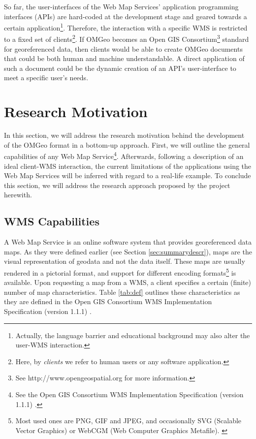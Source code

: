 \documentclass[a4paper,11pt,openany,notitlepage]{article}
\begin{document}
So far, the user-interfaces of the Web Map Services' application programming interfaces (APIs) are hard-coded at the development stage and geared towards a certain application\footnote{Actually, the language barrier and educational background may also alter the user-WMS interaction.}. Therefore, the interaction with a specific WMS is restricted to a fixed set of clients\footnote{Here, by \textit{clients} we refer to human users or any software application.}. If OMGeo becomes an Open GIS Consortium\footnote{See http://www.opengeospatial.org for more information.} standard for georeferenced data, then clients would be able to create OMGeo documents that could be both human and machine understandable. A direct application of such a document could be the dynamic creation of an API's user-interface to meet a specific user's needs.

%
\section{Research Motivation} \label{sec:motivation}
\indent

In this section, we will address the research motivation behind the development of the OMGeo format in a bottom-up approach. First, we will outline the general capabilities of any Web Map Service\footnote{See the Open GIS Consortium WMS Implementation Specification (version 1.1.1) \cite{ogc}.}. Afterwards, following a description of an ideal client-WMS interaction, the current limitations of the applications using the Web Map Services will be inferred with regard to a real-life example. To conclude this section, we will address the research approach proposed by the project herewith.

\subsection{WMS Capabilities} \label{subsec:capabilities}
\indent

A Web Map Service is an online software system that provides georeferenced data maps. As they were defined earlier (see Section \ref{sec:summarydescr}), maps are the visual representation of geodata and not the data itself. These maps are usually rendered in a pictorial format, and support for different encoding formats\footnote{Most used ones are PNG, GIF and JPEG, and occasionally SVG (Scalable Vector Graphics) or WebCGM (Web Computer Graphics Metafile). \cite{ogc}} is available. Upon requesting a map from a WMS, a client specifies a certain (finite) number of map characteristics. Table \ref{tab:def} outlines these characteristics as they are defined in the Open GIS Consortium WMS Implementation Specification (version 1.1.1) \cite{ogc}.
\end{document}
